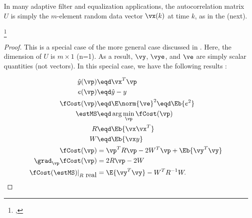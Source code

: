 In many adaptive filter and equalization applications,
the autocorrelation matrix $U$ is simply the $m$-element
random data vector $\vx(k)$ at time $k$, as in the  (next).
\begin{corollary}
\footnote{
  , 
  }
\end{corollary}
\begin{proof}
This is a special case of the more general case discussed
in .
Here, the dimension of $U$ is $m\times1$ (n=1).
As a result,
$\vy$, $\vye$, and $\ve$ are simply scalar quantities (not vectors).
In this special case, we have the following results
:

\begin{align*}
   \hat{y}(\vp)   &\eqd \vx^T \vp    \\
   e(\vp)    &\eqd \hat{y}-y \\
   \fCost(\vp) &\eqd \E\norm{\ve}^2 \eqd \Eb{e^2} \\
   \estMS      &\eqd \arg\min_\vp \fCost(\vp)  \\
   R           &\eqd \Eb{\vx\vx^T}   \\
   W           &\eqd \Eb{ \vx y }    \\
    \fCost(\vp)                     &= \vp^T R \vp -2W^T\vp  + \Eb{\vy^T\vy} \\
    \grad_\vp \fCost(\vp)           &= 2R\vp - 2W  \\
    \fCost(\estMS)|_{R\mbox{ real}} &=    \E{\vy^T\vy} - W^T R^{-1}W.
\end{align*}
\end{proof}

